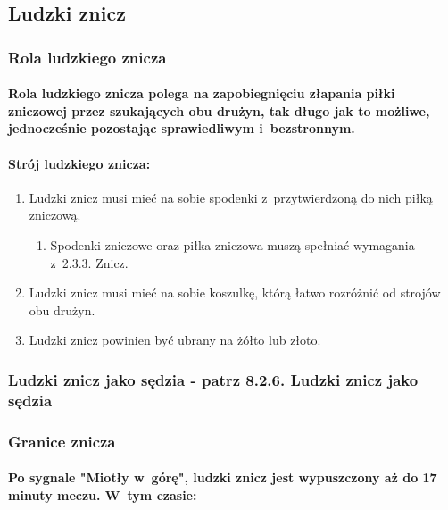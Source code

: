 \documentclass[12pt,a4paper]{article}
\begin{document}
\subsection{Ludzki znicz}

\subsubsection{Rola ludzkiego znicza}

\paragraph{Rola ludzkiego znicza polega na zapobiegnięciu
	złapania piłki zniczowej przez szukających obu drużyn, tak długo jak to
	możliwe, jednocześnie pozostając sprawiedliwym i~bezstronnym.}

\paragraph{Strój ludzkiego znicza:}

\begin{enumerate}
	\item
	      Ludzki znicz musi mieć na sobie spodenki z~przytwierdzoną do nich
	      piłką zniczową.

	      \begin{enumerate}
		      \item
		            Spodenki zniczowe oraz piłka zniczowa muszą spełniać wymagania z~2.3.3. Znicz.
	      \end{enumerate}
	\item
	      Ludzki znicz musi mieć na sobie koszulkę, którą łatwo rozróżnić od
	      strojów obu drużyn.
	\item
	      Ludzki znicz powinien być ubrany na żółto lub złoto.
\end{enumerate}

\subsubsection{Ludzki znicz jako sędzia - patrz 8.2.6. Ludzki znicz jako sędzia}

\subsubsection{Granice znicza}

\paragraph{Po sygnale "Miotły w~górę", ludzki znicz jest
	wypuszczony aż do 17 minuty meczu. W~tym czasie:}
\end{document}
